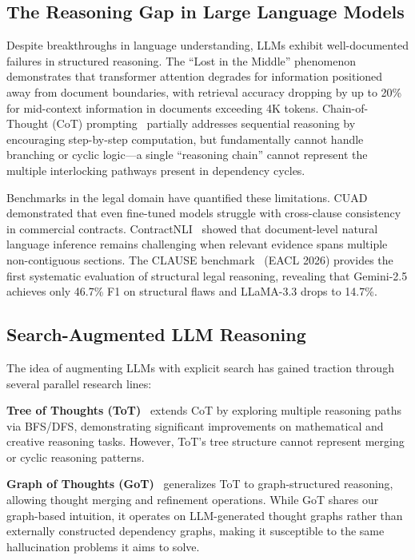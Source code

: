 \documentclass{article}
\begin{document}
\subsection{The Reasoning Gap in Large Language Models}

Despite breakthroughs in language understanding, LLMs exhibit well-documented failures in structured reasoning. The ``Lost in the Middle'' phenomenon~\cite{lostinthemiddle} demonstrates that transformer attention degrades for information positioned away from document boundaries, with retrieval accuracy dropping by up to 20\% for mid-context information in documents exceeding 4K tokens. Chain-of-Thought (CoT) prompting~\cite{cot} partially addresses sequential reasoning by encouraging step-by-step computation, but fundamentally cannot handle branching or cyclic logic---a single ``reasoning chain'' cannot represent the multiple interlocking pathways present in dependency cycles.

Benchmarks in the legal domain have quantified these limitations. CUAD~\cite{cuad} demonstrated that even fine-tuned models struggle with cross-clause consistency in commercial contracts. ContractNLI~\cite{contractnli} showed that document-level natural language inference remains challenging when relevant evidence spans multiple non-contiguous sections. The CLAUSE benchmark~\cite{clause} (EACL 2026) provides the first systematic evaluation of structural legal reasoning, revealing that Gemini-2.5 achieves only 46.7\% F1 on structural flaws and LLaMA-3.3 drops to 14.7\%.

\subsection{Search-Augmented LLM Reasoning}

The idea of augmenting LLMs with explicit search has gained traction through several parallel research lines:

\textbf{Tree of Thoughts (ToT)}~\cite{tot} extends CoT by exploring multiple reasoning paths via BFS/DFS, demonstrating significant improvements on mathematical and creative reasoning tasks. However, ToT's tree structure cannot represent merging or cyclic reasoning patterns.

\textbf{Graph of Thoughts (GoT)}~\cite{got} generalizes ToT to graph-structured reasoning, allowing thought merging and refinement operations. While GoT shares our graph-based intuition, it operates on LLM-generated thought graphs rather than externally constructed dependency graphs, making it susceptible to the same hallucination problems it aims to solve.
\end{document}
